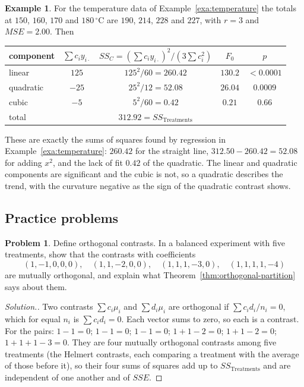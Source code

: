 \documentclass[11pt,a4paper]{article}
\numberwithin{equation}{section}
\theoremstyle{definition}
\newtheorem{exa}[thm]{Example}
\newtheorem{problemx}{Problem}[subsection]
\newenvironment{problem}{\begin{problemx}}{\end{problemx}}
\newenvironment{solution}
  {\renewcommand{\qedsymbol}{}\begin{proof}[\textit{Solution}.]}
  {\end{proof}}
\begin{document}
\begin{exa}
For the temperature data of Example~\ref{exa:temperature} the totals at $150$, $160$, $170$ and $180\,^\circ$C are $190$, $214$, $228$ and $227$, with $r = 3$ and $MSE = 2.00$. Then
\begin{center}
\begin{tabular}{l|c|c|c|c}
component & $\sum c_iy_{i\cdot}$ & $SS_C = (\sum c_iy_{i\cdot})^2/(3\sum c_i^2)$ & $F_0$ & $p$ \\
\hline
linear & $125$ & $125^2/60 = 260.42$ & $130.2$ & $< 0.0001$ \\
quadratic & $-25$ & $25^2/12 = 52.08$ & $26.04$ & $0.0009$ \\
cubic & $-5$ & $5^2/60 = 0.42$ & $0.21$ & $0.66$ \\
\hline
total & & $312.92 = SS_{\mathrm{Treatments}}$ & &
\end{tabular}
\end{center}
These are exactly the sums of squares found by regression in Example~\ref{exa:temperature}: $260.42$ for the straight line, $312.50 - 260.42 = 52.08$ for adding $x^2$,
and the lack of fit $0.42$ of the quadratic. The linear and quadratic components are significant and the cubic is not, so a quadratic describes the
trend, with the curvature negative as the sign of the quadratic contrast shows.
\end{exa}

\subsection{Practice problems}

\begin{problem}
Define orthogonal contrasts. In a balanced experiment with five treatments, show that the contrasts with coefficients
\[
(1, -1, 0, 0, 0) , \quad (1, 1, -2, 0, 0) , \quad (1, 1, 1, -3, 0) , \quad (1, 1, 1, 1, -4)
\]
are mutually orthogonal, and explain what Theorem~\ref{thm:orthogonal-partition} says about them.
\end{problem}

\begin{solution}
Two contrasts $\sum c_i\mu_i$ and $\sum d_i\mu_i$ are orthogonal if $\sum c_id_i/n_i = 0$, which for equal $n_i$ is $\sum c_id_i = 0$. Each vector sums to zero, so each is a contrast. For the
pairs: $1 - 1 = 0$; $1 - 1 = 0$; $1 - 1 = 0$; $1 + 1 - 2 = 0$; $1 + 1 - 2 = 0$; $1 + 1 + 1 - 3 = 0$. They are four mutually orthogonal contrasts among five treatments
(the Helmert contrasts, each comparing a treatment with the average of those before it), so their four sums of squares add up to $SS_{\mathrm{Treatments}}$ and
are independent of one another and of $SSE$.
\end{solution}
\end{document}
